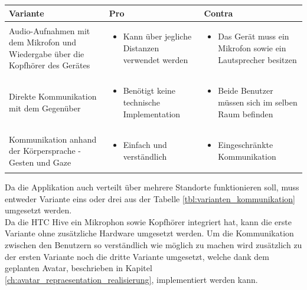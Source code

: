 \begin{center}
	\begin{tabularx} {\textwidth} { | B | B | B | }
		\hline
		\color{white} \textbf{Variante} & \color{white} \textbf{Pro} & 
		\color{white} \textbf{Contra} \\
		\hline
		\vspace{1pt}
		Audio-Aufnahmen mit dem Mikrofon und Wiedergabe über die Kopfhörer des Gerätes & 
		\begin{itemize} [leftmargin=*,noitemsep,topsep=0pt]
			\item Kann über jegliche Distanzen verwendet werden
		\end{itemize} & 
		\begin{itemize} [leftmargin=*,noitemsep,topsep=0pt]
			\item Das Gerät muss ein Mikrofon sowie ein Lautsprecher besitzen
		\end{itemize} \\
		\hline
		\vspace{1pt}
		Direkte Kommunikation mit dem Gegenüber & 
		\begin{itemize} [leftmargin=*,noitemsep,topsep=0pt]
			\item Benötigt keine technische Implementation
		\end{itemize} & 
		\begin{itemize} [leftmargin=*,noitemsep,topsep=0pt]
			\item Beide Benutzer müssen sich im selben Raum befinden
		\end{itemize} \\
		\hline
		\vspace{1pt}
		Kommunikation anhand der Körpersprache - Gesten und Gaze & 
		\begin{itemize} [leftmargin=*,noitemsep,topsep=0pt]
			\item Einfach und verständlich
		\end{itemize} & 
		\begin{itemize} [leftmargin=*,noitemsep,topsep=0pt]
			\item Eingeschränkte Kommunikation
		\end{itemize} \\
		\hline	
	\end{tabularx}
\end{center}
\label{tbl:varianten_kommunikation}

\bigskip
Da die Applikation auch verteilt über mehrere Standorte funktionieren soll, muss entweder Variante eins oder drei aus der Tabelle \ref{tbl:varianten_kommunikation} umgesetzt werden.  \\
Da die HTC Hive ein Mikrophon sowie Kopfhörer integriert hat, kann die erste Variante ohne zusätzliche Hardware umgesetzt werden. Um die Kommunikation zwischen den Benutzern so verständlich wie möglich zu machen wird zusätzlich zu der ersten Variante noch die dritte Variante umgesetzt, welche dank dem geplanten Avatar, beschrieben in Kapitel \ref{ch:avatar_repraesentation_realisierung}, implementiert werden kann.


